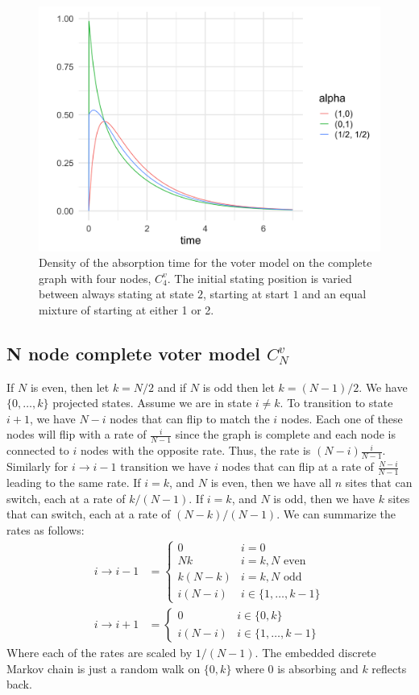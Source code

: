 \begin{figure}[H]
  \centering
    \includegraphics[width=.80\textwidth]{figures/voter_density_c4.png}
   \caption{Density of the absorption time for the voter model on the complete graph with four nodes, $C^{v}_4$. The initial stating position is varied between always stating at state $2$, starting at start $1$ and an equal mixture of starting at either 1 or 2.}
  \label{fig:voter_density_c4}
\end{figure}

\subsection{N node complete voter model \texorpdfstring{$C^{v}_N$}{VC_N}}
If $N$ is even, then let $k = N / 2$ and if $N$ is odd then let $k = (N - 1)/2$.
We have $\{0,\ldots, k\}$ projected states.
Assume we are in state $i \not = k$.
To transition to state $i + 1$, we have $N - i$ nodes that can flip to match the $i$ nodes.
Each one of these nodes will flip with a rate of $\frac{i}{N - 1}$ since the graph is complete and each node is connected to $i$ nodes with the opposite rate.
Thus, the rate is $(N - i) \frac{i}{N - 1}$.
Similarly for $i \to i - 1$ transition we have $i$ nodes that can flip at a rate of $\frac{N - i}{N - 1}$ leading to the same rate.
If $i = k$, and $N$ is even, then we have all $n$ sites that can switch, each at a rate of $k / (N - 1)$.
If $i = k$, and $N$ is odd, then we have $k$ sites that can switch, each at a rate of $(N - k ) / (N - 1)$.
We can summarize the rates as follows:
\begin{align*}
    i \to i - 1 &= \begin{cases}
        0 & i = 0\\
        Nk & i = k, N \text{ even}\\
        k (N - k) & i = k, N \text{ odd}\\
        i (N - i) & i \in \{1,\ldots, k - 1\}
    \end{cases}\\
    i \to i + 1 &= \begin{cases}
        0 & i \in \{0, k\}\\
        i (N - i) & i \in \{1,\ldots, k - 1\}
    \end{cases}
\end{align*}
Where each of the rates are scaled by $1/(N - 1)$.
The embedded discrete Markov chain is just a random walk on $\{0, k\}$ where 0 is absorbing and $k$ reflects back.

